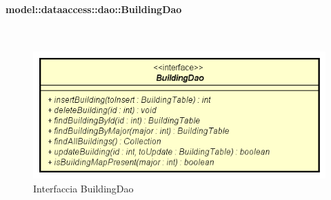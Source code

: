 \documentclass[../DefinizioneDiProdotto.tex]{subfiles}
\begin{document}
\paragraph{model::dataaccess::dao::BuildingDao}
\
\begin{figure}[H]
	\centering
	\includegraphics[width=\maxwidth]{img/BuildingDao.png}
	\caption{Interfaccia BuildingDao}\label{fig:model::dataaccess::dao::BuildingDao} 
\end{figure}
\end{document}

